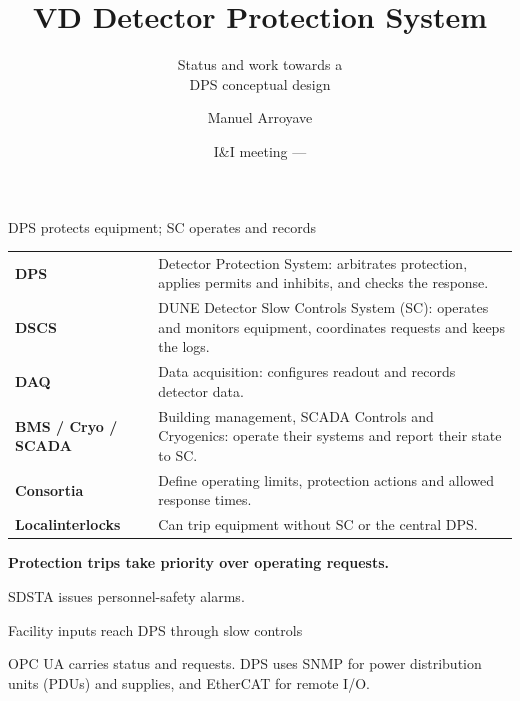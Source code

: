 \documentclass[aspectratio=169,11pt]{beamer}
\title{VD Detector Protection System}
\subtitle{Status and work towards a \\ DPS conceptual design}
\author{Manuel Arroyave}
\date{I\&I meeting --- \DpsMeetingDate}
\begin{document}
\begin{frame}[plain]
  \titlepage
\end{frame}

\DpsKnownAndMissing

\begin{frame}{DPS protects equipment; SC operates and records}
\renewcommand{\arraystretch}{1.18}
\begin{tabularx}{\textwidth}{@{}>{\RaggedRight\arraybackslash}p{2.2cm}>{\RaggedRight\arraybackslash}X@{}}
\textbf{DPS} & Detector Protection System: arbitrates protection, applies permits and inhibits, and checks the response.\\
    \textbf{DSCS} & DUNE Detector Slow Controls System (SC): operates and monitors equipment, coordinates requests and keeps the logs.\\
\textbf{DAQ} & Data acquisition: configures readout and records detector data.\\
\textbf{BMS / Cryo / SCADA} & Building management, SCADA Controls and Cryogenics: operate their systems and report their state to SC.\\
\textbf{Consortia} & Define operating limits, protection actions and allowed response times.\\
\textbf{Local\newline interlocks} & Can trip equipment without SC or the central DPS.\\
\end{tabularx}\par\bigskip
\textbf{Protection trips take priority over operating requests.}\par\medskip
SDSTA issues personnel-safety alarms.
\end{frame}


\begin{frame}{Facility inputs reach DPS through slow controls}
\centering
{}\par\smallskip
\raggedright{}\par\smallskip
\raggedright

OPC UA carries status and requests. DPS uses SNMP for power distribution units (PDUs) and supplies, and EtherCAT for remote I/O.
\end{frame}
\end{document}

